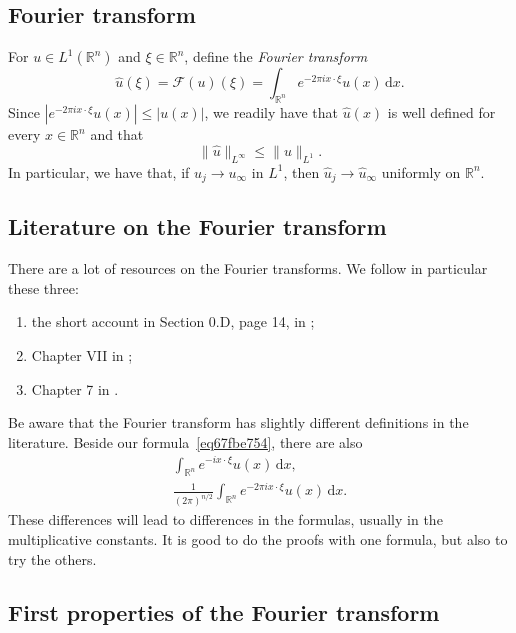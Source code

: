 \documentclass[a4paper,9pt]{amsart}
\newcommand{\scr}[1]{\mathscr{#1}}
\newcommand{\R}{\mathbb{R}}	%
\newcommand{\did}{\,\mathrm{d}}	%
\theoremstyle{plain}
\theoremstyle{definition}
\theoremstyle{remark}
\begin{document}
\subsection{Fourier transform}
For $u\in L^1(\R^n)$ and $\xi\in\R^n$, define the \emph{Fourier transform}
\begin{equation}\label{eq67fbe754}
	\hat u (\xi) = \scr F(u)(\xi) 
	= %
	\int_{\R^n} e^{-2\pi i x\cdot \xi} u(x) \did x .
\end{equation}
Since $|e^{-2\pi i x\cdot \xi} u(x)|\le |u(x)|$, we readily have that $\hat u(x)$ is well defined for every $x\in\R^n$ and that
\begin{equation}\label{eq67fbf439}
	\|\hat u\|_{L^{\infty}} \le \| u \|_{L^1} .
\end{equation}
In particular, we have that, if $u_j\to u_\infty$ in $L^1$, then $\hat u_j\to \hat u_\infty$ uniformly on $\R^n$.

\subsection{Literature on the Fourier transform}
There are a lot of resources on the Fourier transforms.
We follow in particular these three:
\begin{enumerate}
\item the short account in Section 0.D, page 14, in ; %
\item Chapter VII in ; %
\item Chapter 7 in .%
\end{enumerate}

Be aware that the Fourier transform has slightly different definitions in the literature.
Beside our formula~\eqref{eq67fbe754}, there are also
\begin{gather*}
	\int_{\R^n} e^{-i x\cdot \xi} u(x) \did x , \\
	\frac1{(2\pi)^{n/2}}\int_{\R^n} e^{-2\pi i x\cdot \xi} u(x) \did x .
\end{gather*}
These differences will lead to differences in the formulas, usually in the multiplicative constants.
It is good to do the proofs with one formula, 
but also to try the others.

\subsection{First properties of the Fourier transform}
\end{document}
